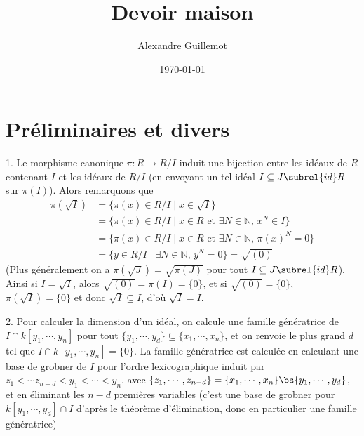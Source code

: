 \documentclass[11pt]{article}
\begin{document}
\title{Devoir maison}
\date{\today}
\author{Alexandre Guillemot}
\maketitle

\section{Préliminaires et divers}
    \begin{question}{1.}
        \label{q11}
        Le morphisme canonique $\pi : R \to R/I$ induit une bijection entre les idéaux de $R$ contenant $I$ et les idéaux de $R/I$ (en envoyant un tel idéal $I \subseteq J \subrel{id} R$ sur $\pi(I)$). Alors remarquons que
        \begin{align*}
            \pi(\sqrt{I}) &= \{\pi(x) \in R/I \mid x \in \sqrt{I}\} \\
            &= \{\pi(x) \in R/I \mid x \in R \text{ et } \exists N \in \mathbb{N},\, x^N \in I\} \\
            &= \{\pi(x) \in R/I \mid x \in R \text{ et } \exists N \in \mathbb{N},\, \pi(x)^N = 0\} \\
            &= \{y \in R/I \mid \exists N \in \mathbb{N},\, y^N = 0\} = \sqrt{(0)}
        \end{align*}
        (Plus généralement on a $\pi(\sqrt{J}) = \sqrt{\pi(J)}$ pour tout $I \subseteq J \subrel{id} R$). Ainsi si $I = \sqrt{I}$, alors $\sqrt{(0)} = \pi(I) = \{0\}$, et si $\sqrt{(0)} = \{0\}$, $\pi(\sqrt{I}) = \{0\}$ et donc $\sqrt{I} \subseteq I$, d'où $\sqrt{I} = I$.
    \end{question}
    \begin{question}{2.}
        Pour calculer la dimension d'un idéal, on calcule une famille génératrice de $I \cap k[y_1, \cdots, y_n]$ pour tout $\{y_1, \cdots, y_d\} \subseteq \{x_1, \cdots, x_n\}$, et on renvoie le plus grand $d$ tel que $I \cap k[y_1, \cdots, y_n] = \{0\}$. La famille génératrice est calculée en calculant une base de grobner de $I$ pour l'ordre lexicographique induit par $z_1 < \cdots z_{n - d} < y_1 < \cdots < y_n$, avec $\{z_1, \cdots, z_{n - d}\} = \{x_1, \cdots, x_n\} \bs \{y_1, \cdots, y_d\}$, et en éliminant les $n - d$ premières variables (c'est une base de grobner pour $k[y_1, \cdots, y_d] \cap I$ d'après le théorème d'élimination, donc en particulier une famille génératrice)
    \end{question}
\end{document}
